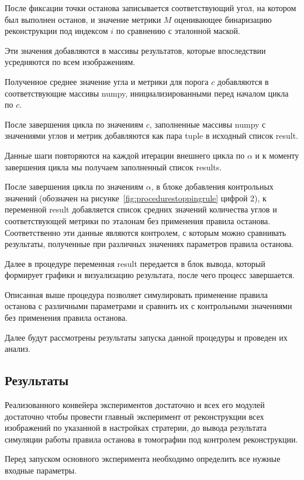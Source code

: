 После фиксации точки останова записывается соответствующий угол, на котором был выполнен останов, и значение метрики \(M\) оценивающее бинаризацию реконструкции под индексом \(i\) по сравнению с эталонной маской.

Эти значения добавляются в массивы результатов, которые впоследствии усредняются по всем изображениям.

Полученное среднее значение угла и метрики для порога \(c\) добавляются в соответствующие массивы numpy, инициализированными перед началом цикла по \(c\).

После завершения цикла по значениям \(c\), заполненные массивы numpy с значениями углов и метрик добавляются как пара tuple в исходный список result.

Данные шаги повторяются на каждой итерации внешнего цикла по \(\alpha\) и к моменту завершения цикла мы получаем заполненный список results.

После завершения цикла по значениям \(\alpha\), в блоке добавления контрольных значений (обозначен на рисунке~\ref*{fig:procedurestoppingrule} цифрой 2), к переменной result добавляется список средних значений количества углов и соответствующей метрики по эталонам без применения правила останова. Соответственно эти данные являются контролем, с которым можно сравнивать результаты, полученные при различных значениях параметров правила останова.

Далее в процедуре переменная result передается в блок вывода, который формирует графики и визуализацию результата, после чего процесс завершается.

Описанная выше процедура позволяет симулировать применение правила останова с различными параметрами и сравнить их с контрольными значениями без применения правила останова.

Далее будут рассмотрены результаты запуска данной процедуры и проведен их анализ.

\subsection{Результаты}

Реализованного конвейера экспериментов достаточно и всех его модулей достаточно чтобы провести главный эксперимент от реконструкции всех изображений по указанной в настройках стратерии, до вывода результата симуляции работы правила останова в томографии под контролем реконструкции.

Перед запуском основного эксперимента необходимо определить все нужные входные параметры.

